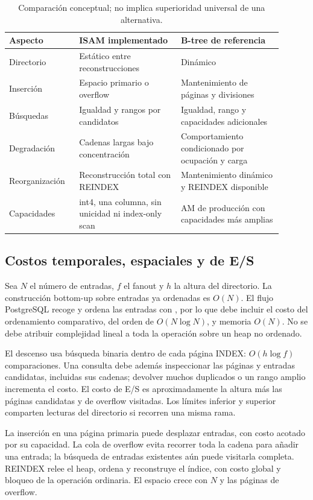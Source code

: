 \documentclass[11pt,a4paper]{article}
\newcommand{\code}[1]{\texttt{\detokenize{#1}}}
\begin{document}
\begin{table}[htbp]
\centering\small
\begin{tabular}{P{0.22\linewidth}P{0.34\linewidth}P{0.34\linewidth}}
\toprule
Aspecto & ISAM implementado & B-tree de referencia\\
\midrule
Directorio & Estático entre reconstrucciones & Dinámico\\
Inserción & Espacio primario o overflow & Mantenimiento de páginas y divisiones\\
Búsquedas & Igualdad y rangos por candidatos & Igualdad, rango y capacidades adicionales\\
Degradación & Cadenas largas bajo concentración & Comportamiento condicionado por ocupación y carga\\
Reorganización & Reconstrucción total con REINDEX & Mantenimiento dinámico y REINDEX disponible\\
Capacidades & int4, una columna, sin unicidad ni index-only scan
            & AM de producción con capacidades más amplias\\
\bottomrule
\end{tabular}
\caption{Comparación conceptual; no implica superioridad universal de una alternativa.}
\end{table}

\subsection{Costos temporales, espaciales y de E/S}

Sea $N$ el número de entradas, $f$ el fanout y $h$ la altura del directorio. La
construcción bottom-up sobre entradas ya ordenadas es $O(N)$. El flujo PostgreSQL
recoge y ordena las entradas con \code{qsort}, por lo que debe incluir el costo del
ordenamiento comparativo, del orden de $O(N\log N)$, y memoria $O(N)$. No se debe
atribuir complejidad lineal a toda la operación \code{CREATE INDEX} sobre un heap
no ordenado.

El descenso usa búsqueda binaria dentro de cada página INDEX: $O(h\log f)$
comparaciones. Una consulta debe además inspeccionar las páginas y entradas
candidatas, incluidas sus cadenas; devolver muchos duplicados o un rango amplio
incrementa el costo. El costo de E/S es aproximadamente la altura más las páginas
candidatas y de overflow visitadas. Los límites inferior y superior comparten
lecturas del directorio si recorren una misma rama.

La inserción en una página primaria puede desplazar entradas, con costo acotado
por su capacidad. La cola de overflow evita recorrer toda la cadena para añadir
una entrada; la búsqueda de entradas existentes aún puede visitarla completa.
REINDEX relee el heap, ordena y reconstruye el índice, con costo global y bloqueo
de la operación ordinaria. El espacio crece con $N$ y las páginas de overflow.
\end{document}
